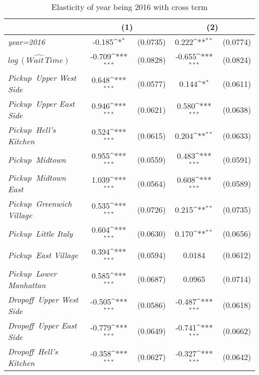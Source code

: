 \begin{table}[h]
\caption{Elasticity of year being 2016 with cross term}\label{tab:2016_regression}\\


{
\def\sym#1{\ifmmode^{#1}\else\(^{#1}\)\fi}
\begin{center}
\begin{tabular}{l*{2}{cc}}
\hline\hline
            &\multicolumn{2}{c}{(1)}           &\multicolumn{2}{c}{(2)}           \\
        
\hline
\textit{year=2016}    &      -0.185\sym{*}  &    (0.0735)&       0.222\sym{**} &    (0.0774)\\
${\widehat{log\, (Wait\, Time)}}$&      -0.709\sym{***}&    (0.0828)&      -0.655\sym{***}&    (0.0824)\\
\textit{Pickup\, Upper West Side}&       0.648\sym{***}&    (0.0577)&       0.144\sym{*}  &    (0.0611)\\
\textit{Pickup\, Upper East Side}&       0.946\sym{***}&    (0.0621)&       0.580\sym{***}&    (0.0638)\\
\textit{Pickup\, Hell's Kitchen}&       0.524\sym{***}&    (0.0615)&       0.204\sym{**} &    (0.0633)\\
\textit{Pickup\, Midtown}&       0.955\sym{***}&    (0.0559)&       0.483\sym{***}&    (0.0591)\\
\textit{Pickup\, Midtown East}&       1.039\sym{***}&    (0.0564)&       0.608\sym{***}&    (0.0589)\\
\textit{Pickup\, Greenwich Village}&       0.535\sym{***}&    (0.0726)&       0.215\sym{**} &    (0.0735)\\
\textit{Pickup\, Little Italy}&       0.604\sym{***}&    (0.0630)&       0.170\sym{**} &    (0.0656)\\
\textit{Pickup\, East Village}&       0.394\sym{***}&    (0.0594)&      0.0184         &    (0.0612)\\
\textit{Pickup\, Lower Manhattan}&       0.585\sym{***}&    (0.0687)&      0.0965         &    (0.0714)\\
\textit{Dropoff\, Upper West Side}&      -0.505\sym{***}&    (0.0586)&      -0.487\sym{***}&    (0.0618)\\
\textit{Dropoff\, Upper East Side}&      -0.779\sym{***}&    (0.0649)&      -0.741\sym{***}&    (0.0662)\\
\textit{Dropoff\, Hell's Kitchen}&      -0.358\sym{***}&    (0.0627)&      -0.327\sym{***}&    (0.0642)\\

\end{tabular}
\end{center}}
\end{table}
